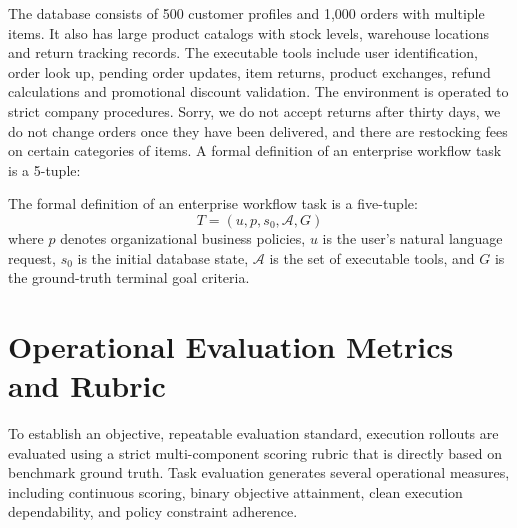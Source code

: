 \documentclass[a4paper, 12pt]{report}
\begin{document}
The database consists of 500 customer profiles and 1,000 orders with multiple items. It also has large product catalogs with stock levels, warehouse locations and return tracking records. The executable tools include user identification, order look up, pending order updates, item returns, product exchanges, refund calculations and promotional discount validation. The environment is operated to strict company procedures. Sorry, we do not accept returns after thirty days, we do not change orders once they have been delivered, and there are restocking fees on certain categories of items. A formal definition of an enterprise workflow task is a 5-tuple:

The formal definition of an enterprise workflow task is a five-tuple:
\begin{equation}
    T = (u, p, s_0, \mathcal{A}, G)
\end{equation}
where $p$ denotes organizational business policies, $u$ is the user's natural language request, $s_0$ is the initial database state, $\mathcal{A}$ is the set of executable tools, and $G$ is the ground-truth terminal goal criteria.

\section{Operational Evaluation Metrics and Rubric}
To establish an objective, repeatable evaluation standard, execution rollouts are evaluated using a strict multi-component scoring rubric that is directly based on benchmark ground truth. Task evaluation generates several operational measures, including continuous scoring, binary objective attainment, clean execution dependability, and policy constraint adherence.
\end{document}
